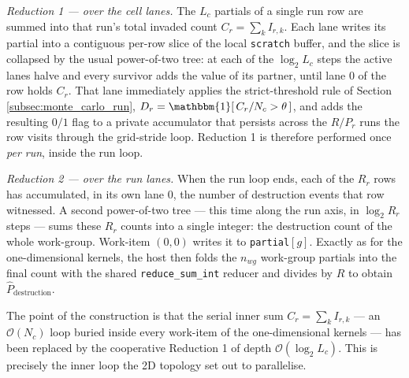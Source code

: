 \emph{Reduction 1 --- over the cell lanes.} The $L_c$ partials of a single run row are summed into that run's total invaded count $C_r = \sum_k I_{r,k}$. Each lane writes its partial into a contiguous per-row slice of the local \texttt{scratch} buffer, and the slice is collapsed by the usual power-of-two tree: at each of the $\log_2 L_c$ steps the active lanes halve and every survivor adds the value of its partner, until lane $0$ of the row holds $C_r$. That lane immediately applies the strict-threshold rule of Section \ref{subsec:monte_carlo_run}, $D_r = \mathbbm{1}\!\left[\,C_r / N_c > \theta\,\right]$, and adds the resulting $0/1$ flag to a private accumulator that persists across the $R/P_r$ runs the row visits through the grid-stride loop. Reduction 1 is therefore performed once \emph{per run}, inside the run loop.

\emph{Reduction 2 --- over the run lanes.} When the run loop ends, each of the $R_r$ rows has accumulated, in its own lane $0$, the number of destruction events that row witnessed. A second power-of-two tree --- this time along the run axis, in $\log_2 R_r$ steps --- sums these $R_r$ counts into a single integer: the destruction count of the whole work-group. Work-item $(0,0)$ writes it to \texttt{partial}$[g]$. Exactly as for the one-dimensional kernels, the host then folds the $n_{wg}$ work-group partials into the final count with the shared \texttt{reduce\_sum\_int} reducer and divides by $R$ to obtain $\hat{P}_{\text{destruction}}$.

The point of the construction is that the serial inner sum $C_r = \sum_k I_{r,k}$ --- an $\mathcal{O}(N_c)$ loop buried inside every work-item of the one-dimensional kernels --- has been replaced by the cooperative Reduction 1 of depth $\mathcal{O}(\log_2 L_c)$. This is precisely the inner loop the 2D topology set out to parallelise.

